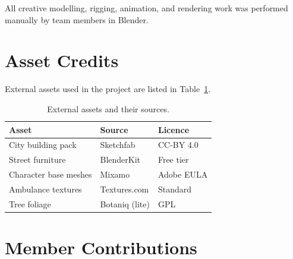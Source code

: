 \documentclass[10pt, twocolumn]{article}
\begin{document}
All creative modelling, rigging, animation, and rendering work was performed
manually by team members in Blender.

\section{Asset Credits}
\label{sec:credits}

External assets used in the project are listed in Table~\ref{tab:assets}.

\begin{table}[H]
  \centering
  \caption{External assets and their sources.}
  \label{tab:assets}
  \renewcommand{\arraystretch}{1.2}
  \begin{tabular}{p{2.8cm} p{1.5cm} p{2.4cm}}
    \toprule
    \textbf{Asset} & \textbf{Source} & \textbf{Licence} \\
    \midrule
    City building pack    & Sketchfab   & CC-BY 4.0 \\
    Street furniture      & BlenderKit  & Free tier \\
    Character base meshes & Mixamo      & Adobe EULA \\
    Ambulance textures    & Textures.com & Standard \\
    Tree foliage          & Botaniq (lite) & GPL \\
    \bottomrule
  \end{tabular}
\end{table}

\section{Member Contributions}
\label{sec:contributions}
\end{document}
